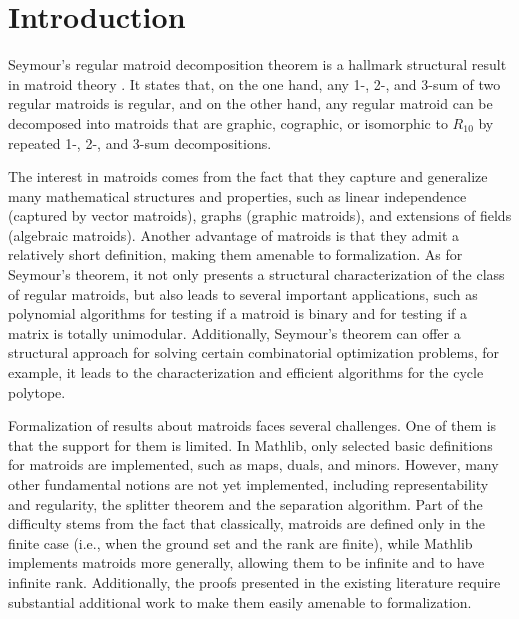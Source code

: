 \section{Introduction}

Seymour's regular matroid decomposition theorem is a hallmark structural result in matroid theory \cite{Oxley2011,Truemper2016,Geelen2005,Kingan2015}. It states that, on the one hand, any 1-, 2-, and 3-sum of two regular matroids is regular, and on the other hand, any regular matroid can be decomposed into matroids that are graphic, cographic, or isomorphic to $R_{10}$ by repeated 1-, 2-, and 3-sum decompositions.

The interest in matroids comes from the fact that they capture and generalize many mathematical structures and properties, such as linear independence (captured by vector matroids), graphs (graphic matroids), and extensions of fields (algebraic matroids). Another advantage of matroids is that they admit a relatively short definition, making them amenable to formalization. As for Seymour's theorem, it not only presents a structural characterization of the class of regular matroids, but also leads to several important applications, such as polynomial algorithms for testing if a matroid is binary and for testing if a matrix is totally unimodular. Additionally, Seymour's theorem can offer a structural approach for solving certain combinatorial optimization problems, for example, it leads to the characterization and efficient algorithms for the cycle polytope.

Formalization of results about matroids faces several challenges. One of them is that the support for them is limited. In Mathlib, only selected basic definitions for matroids are implemented, such as maps, duals, and minors. However, many other fundamental notions are not yet implemented, including representability and regularity, the splitter theorem and the separation algorithm. Part of the difficulty stems from the fact that classically, matroids are defined only in the finite case (i.e., when the ground set and the rank are finite), while Mathlib implements matroids more generally, allowing them to be infinite and to have infinite rank. Additionally, the proofs presented in the existing literature require substantial additional work to make them easily amenable to formalization.

